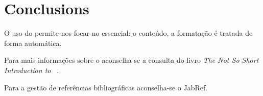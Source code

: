 

\chapter{Conclusions}
\label{ch:conclusion}


O uso do \LaTeXe permite-nos focar no essencial: o conteúdo, a formatação é tratada de forma automática.

Para mais informações sobre o \LaTeXe aconselha-se a consulta do
livro \emph{The Not So Short Introduction to \LaTeXe}~\cite{oetiker2000nss}.

Para a gestão de referências bibliográficas aconselha-se o JabRef. %
